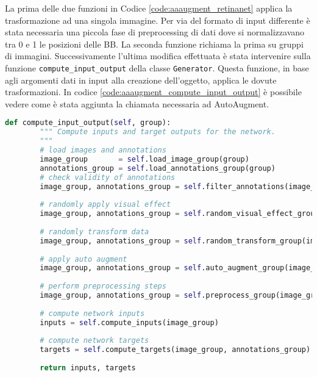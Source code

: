 La prima delle due funzioni in Codice \ref{code:aaaugment_retinanet} applica la trasformazione ad una singola immagine. Per via del formato di input differente è stata necessaria una piccola fase di preprocessing di dati dove si normalizzavano tra 0 e 1 le posizioni delle \ac{BB}. La seconda funzione richiama la prima su gruppi di immagini. 
Successivamente l'ultima modifica effettuata è stata intervenire sulla funzione \texttt{compute\_input\_output} della classe \texttt{Generator}. Questa funzione, in base agli argomenti dati in input alla creazione dell'oggetto, applica le dovute trasformazioni. In codice \ref{code:aaaugment_compute_input_output} è possibile vedere come è stata aggiunta la chiamata necessaria ad AutoAugment. 


\begin{lstlisting}[caption={Funzione compute\_input\_output del generatore}, language=Python, basicstyle=\tiny,label=code:aaaugment_compute_input_output]
    def compute_input_output(self, group):
        """ Compute inputs and target outputs for the network.
        """
        # load images and annotations
        image_group       = self.load_image_group(group)
        annotations_group = self.load_annotations_group(group)
        # check validity of annotations
        image_group, annotations_group = self.filter_annotations(image_group, annotations_group, group)
    
        # randomly apply visual effect
        image_group, annotations_group = self.random_visual_effect_group(image_group, annotations_group)
    
        # randomly transform data
        image_group, annotations_group = self.random_transform_group(image_group, annotations_group)
        
        # apply auto augment
        image_group, annotations_group = self.auto_augment_group(image_group, annotations_group)
    
        # perform preprocessing steps
        image_group, annotations_group = self.preprocess_group(image_group, annotations_group)
    
        # compute network inputs
        inputs = self.compute_inputs(image_group)
    
        # compute network targets
        targets = self.compute_targets(image_group, annotations_group)
    
        return inputs, targets
\end{lstlisting}

